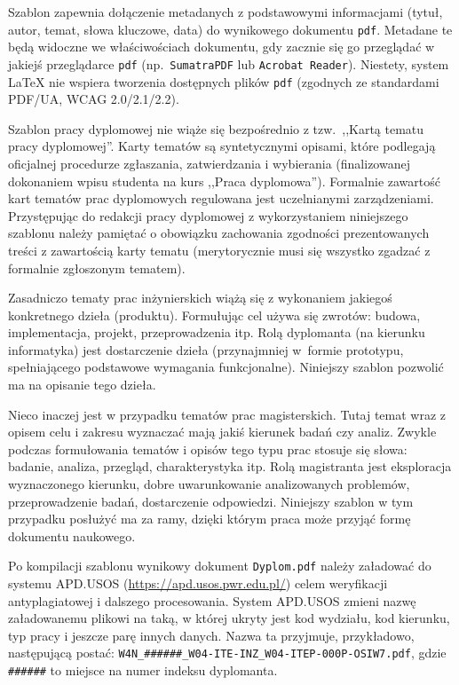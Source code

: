 Szablon zapewnia dołączenie metadanych z podstawowymi informacjami (tytuł, autor, temat, słowa kluczowe, data) do wynikowego dokumentu \texttt{pdf}. Metadane te będą widoczne we właściwościach dokumentu, gdy zacznie się go przeglądać w jakiejś przeglądarce \texttt{pdf} (np.~\texttt{SumatraPDF} lub \texttt{Acrobat Reader}). Niestety, system \LaTeX{} nie wspiera tworzenia dostępnych plików \texttt{pdf} (zgodnych ze standardami PDF/UA, WCAG 2.0/2.1/2.2).

Szablon pracy dyplomowej nie wiąże się bezpośrednio z tzw.\ ,,Kartą tematu pracy dyplomowej''. Karty tematów są syntetycznymi opisami, które podlegają oficjalnej procedurze zgłaszania, zatwierdzania i wybierania (finalizowanej dokonaniem wpisu studenta na kurs ,,Praca dyplomowa''). Formalnie zawartość kart tematów prac dyplomowych regulowana jest uczelnianymi zarządzeniami. Przystępując do redakcji pracy dyplomowej z wykorzystaniem niniejszego szablonu należy pamiętać o obowiązku zachowania zgodności prezentowanych treści z zawartością karty tematu (merytorycznie musi się wszystko zgadzać z formalnie zgłoszonym tematem).

Zasadniczo tematy prac inżynierskich wiążą się z wykonaniem jakiegoś konkretnego dzieła (produktu). Formułując cel używa się zwrotów: budowa, implementacja, projekt, przeprowadzenia itp. Rolą dyplomanta (na kierunku informatyka) jest dostarczenie dzieła (przynajmniej w~formie prototypu, spełniającego podstawowe wymagania funkcjonalne). Niniejszy szablon pozwolić ma na opisanie tego dzieła.

Nieco inaczej jest w przypadku tematów prac magisterskich. Tutaj temat wraz z opisem celu i zakresu wyznaczać mają jakiś kierunek badań czy analiz. Zwykle podczas formułowania tematów i opisów tego typu prac stosuje się słowa: badanie, analiza, przegląd, charakterystyka itp. Rolą magistranta jest eksploracja wyznaczonego kierunku, dobre uwarunkowanie analizowanych problemów, przeprowadzenie badań, dostarczenie odpowiedzi. Niniejszy szablon w tym przypadku posłużyć ma za ramy, dzięki którym praca może przyjąć formę dokumentu naukowego.

Po kompilacji szablonu wynikowy dokument \texttt{Dyplom.pdf} należy załadować do systemu APD.USOS (\url{https://apd.usos.pwr.edu.pl/}) celem weryfikacji antyplagiatowej i dalszego procesowania. System APD.USOS zmieni nazwę załadowanemu plikowi na taką, w której ukryty jest kod wydziału, kod kierunku, typ pracy i jeszcze parę innych danych. Nazwa ta przyjmuje, przykładowo, następującą postać: \texttt{W4N\_\#\#\#\#\#\#\_W04-ITE-INZ\_W04-ITEP-000P-OSIW7.pdf}, gdzie \texttt{\#\#\#\#\#\#} to miejsce na numer indeksu dyplomanta. 

